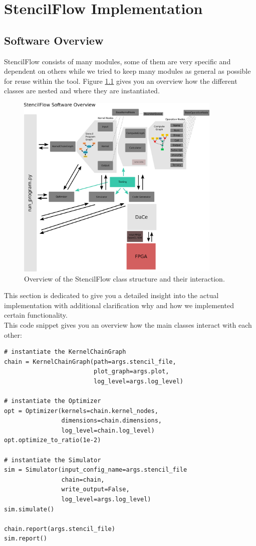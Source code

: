 \chapter{StencilFlow Implementation}



\section{Software Overview}
StencilFlow consists of many modules, some of them are very specific and dependent on others while we tried to keep many modules as general as possible for reuse within the tool. Figure \ref{fig:implementation-class-overview} gives you an overview how the different classes are nested and where they are instantiated.  
\begin{figure}[h]
	\centering
	\includegraphics[height=24em]{drawings/implementation-class-overview.png}
	\caption{Overview of the StencilFlow class structure and their interaction.}
	\label{fig:implementation-class-overview}
\end{figure}
This section is dedicated to give you a detailed insight into the actual implementation with additional clarification why and how we implemented certain functionality.\\


This code snippet gives you an overview how the main classes interact with each other:
\begin{verbatim}  
# instantiate the KernelChainGraph
chain = KernelChainGraph(path=args.stencil_file,
                         plot_graph=args.plot,
                         log_level=args.log_level)

# instantiate the Optimizer
opt = Optimizer(kernels=chain.kernel_nodes,
                dimensions=chain.dimensions,
                log_level=chain.log_level)
opt.optimize_to_ratio(1e-2)
    
# instantiate the Simulator
sim = Simulator(input_config_name=args.stencil_file
                chain=chain,
                write_output=False,
                log_level=args.log_level)
sim.simulate()
            
chain.report(args.stencil_file)
sim.report()
\end{verbatim}






